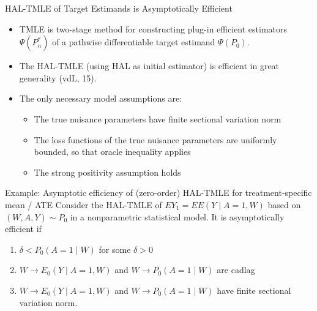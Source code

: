 \documentclass[t]{beamer}
\begin{document}
\begin{frame}{HAL-TMLE of Target Estimands is Asymptotically Efficient}
\begin{itemize}
\item TMLE is two-stage method for constructing plug-in efficient estimators $\Psi(P_n^*)$ of  a pathwise differentiable target estimand $\Psi(P_0)$.
\item
The HAL-TMLE (using HAL as initial estimator) is efficient in great generality (vdL, 15).
\item  The only necessary model assumptions are:
\begin{itemize}
\item The true nuisance parameters have finite sectional variation norm
\item The loss functions of the true nuisance parameters are uniformly bounded, so that oracle inequality applies
\item The strong positivity assumption holds
\end{itemize}
\end{itemize}
\end{frame}

\begin{frame}{Example: Asymptotic  efficiency of (zero-order) HAL-TMLE for treatment-specific mean / ATE}
Consider the HAL-TMLE of $EY_1=EE(Y\mid A=1,W)$ based on $(W,A,Y)\sim P_0$ in a nonparametric statistical model.
\vspace{0.15in}
It is asymptotically efficient if
\begin{enumerate}
\item $\delta<P_0(A=1\mid W)$ for some $\delta>0$
\item $W\rightarrow E_0(Y\mid A=1,W)$  and $W\rightarrow P_0(A=1\mid W)$ are cadlag
\item $W\rightarrow E_0(Y\mid A=1,W)$  and $W\rightarrow P_0(A=1\mid W)$ have finite sectional variation norm.
\end{enumerate}
\end{frame}
\end{document}

